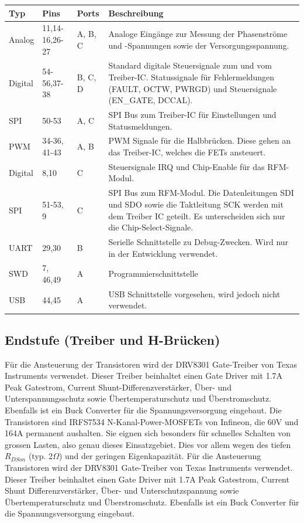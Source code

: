 \begin{tabularx}{\textwidth}{l|l|l|X}
	Typ & Pins & Ports & Beschreibung \\ \hline
	Analog & 
	11,14-16,26-27 & 
	A, B, C &
	Analoge Eingänge zur Messung der Phasenströme und -Spannungen sowie der Versorgungsspannung.
	\\ \hline
	Digital & 
	54-56,37-38 &
	B, C, D &
	Standard digitale Steuersignale zum und vom Treiber-IC. Statussignale für Fehlermeldungen (FAULT, OCTW, PWRGD) und Steuersignale (EN\_GATE, DCCAL).
	\\ \hline
	SPI &
	50-53 &
	A, C &
	SPI Bus zum Treiber-IC für Einstellungen und Statusmeldungen.
	\\ \hline
	PWM &
	34-36, 41-43 &
	A, B &
	PWM Signale für die Halbbrücken. Diese gehen an das Treiber-IC, welches die FETs ansteuert.
	\\ \hline
	Digital &
	8,10 &
	C &
	Steuersignale IRQ und Chip-Enable für das RFM-Modul.
	\\ \hline
	SPI &
	51-53, 9 &
	C &
	SPI Bus zum RFM-Modul. Die Datenleitungen SDI und SDO sowie die Taktleitung SCK werden mit dem Treiber IC geteilt. Es unterscheiden sich nur die Chip-Select-Signale.
	\\ \hline
	UART &
	29,30 &
	B &
	Serielle Schnittstelle zu Debug-Zwecken. Wird nur in der Entwicklung verwendet.
	\\ \hline
	SWD &
	7, 46,49 &
	A &
	Programmierschnittstelle
	\\ \hline
	USB &
	44,45 &
	A &
	USB Schnittstelle vorgesehen, wird jedoch nicht verwendet.
	\\ \hline
\end{tabularx}
\label{tab:iomc}

\subsection*{Endstufe (Treiber und H-Brücken)}
Für die Ansteuerung der Transistoren wird der DRV8301 Gate-Treiber von Texas Instruments verwendet. Dieser Treiber beinhaltet einen Gate Driver mit 1.7A Peak Gatestrom, Current Shunt-Differenzverstärker, Über- und Unterspannungsschutz sowie Übertemperaturschutz und Überstromschutz. Ebenfalls ist ein Buck Converter für die Spannungsversorgung eingebaut.
Die Transistoren sind IRFS7534 N-Kanal-Power-MOSFETs von Infineon, die 60V und 164A permanent aushalten. Sie eignen sich besonders für schnelles Schalten von grossen Lasten, also genau dieses Einsatzgebiet. Dies vor allem wegen des tiefen $R_{DSon}$ (typ. 2\(\Omega\)) und der geringen Eigenkapazität. 
Für die Ansteuerung Transistoren wird der DRV8301 Gate-Treiber von Texas Instruments verwendet. Dieser Treiber beinhaltet einen Gate Driver mit 1.7A Peak Gatestrom, Current Shunt Differenzverstärker, Über- und Unterschutzspannung sowie Übertemperaturschutz und Überstromschutz. Ebenfalls ist ein Buck Converter für die Spannungsversorgung eingebaut. 

